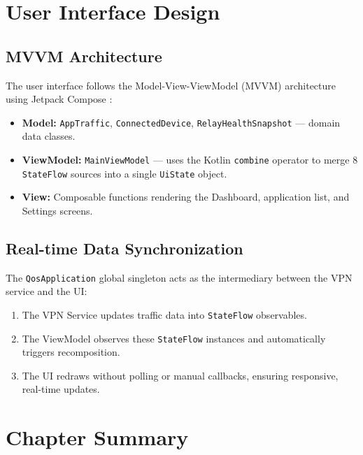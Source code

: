 
\section{User Interface Design}
\label{sec:ui_design}

\subsection{MVVM Architecture}

The user interface follows the Model-View-ViewModel (MVVM) architecture using Jetpack Compose \cite{jetpack_compose}:

\begin{itemize}
    \item \textbf{Model:} \texttt{AppTraffic}, \texttt{ConnectedDevice}, \texttt{RelayHealthSnapshot} --- domain data classes.
    \item \textbf{ViewModel:} \texttt{MainViewModel} --- uses the Kotlin \texttt{combine} operator to merge 8 \texttt{StateFlow} sources into a single \texttt{UiState} object.
    \item \textbf{View:} Composable functions rendering the Dashboard, application list, and Settings screens.
\end{itemize}

\subsection{Real-time Data Synchronization}

The \texttt{QosApplication} global singleton acts as the intermediary between the VPN service and the UI:

\begin{enumerate}
    \item The VPN Service updates traffic data into \texttt{StateFlow} observables.
    \item The ViewModel observes these \texttt{StateFlow} instances and automatically triggers recomposition.
    \item The UI redraws without polling or manual callbacks, ensuring responsive, real-time updates.
\end{enumerate}


\section{Chapter Summary}
\label{sec:ch4_summary}

